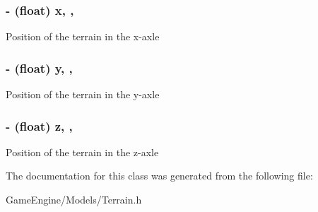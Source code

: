 \subsubsection[{\texorpdfstring{x}{x}}]{\setlength{\rightskip}{0pt plus 5cm}-\/ (float) x\hspace{0.3cm}{\ttfamily [read]}, {\ttfamily [atomic]}, {\ttfamily [assign]}}\hypertarget{interface_terrain_a47761d42d9c6a4ffc7df3a5bf93b7ef2}{}\label{interface_terrain_a47761d42d9c6a4ffc7df3a5bf93b7ef2}
Position of the terrain in the x-\/axle 
\subsubsection[{\texorpdfstring{y}{y}}]{\setlength{\rightskip}{0pt plus 5cm}-\/ (float) y\hspace{0.3cm}{\ttfamily [read]}, {\ttfamily [atomic]}, {\ttfamily [assign]}}\hypertarget{interface_terrain_a6f91dd10a551c69436bee85b674bbdc4}{}\label{interface_terrain_a6f91dd10a551c69436bee85b674bbdc4}
Position of the terrain in the y-\/axle 
\subsubsection[{\texorpdfstring{z}{z}}]{\setlength{\rightskip}{0pt plus 5cm}-\/ (float) z\hspace{0.3cm}{\ttfamily [read]}, {\ttfamily [atomic]}, {\ttfamily [assign]}}\hypertarget{interface_terrain_abf8b4e04a0571cd394dbef7e2b0f06ac}{}\label{interface_terrain_abf8b4e04a0571cd394dbef7e2b0f06ac}
Position of the terrain in the z-\/axle 

The documentation for this class was generated from the following file\+:\begin{DoxyCompactItemize}
\item 
Game\+Engine/\+Models/Terrain.\+h\end{DoxyCompactItemize}

